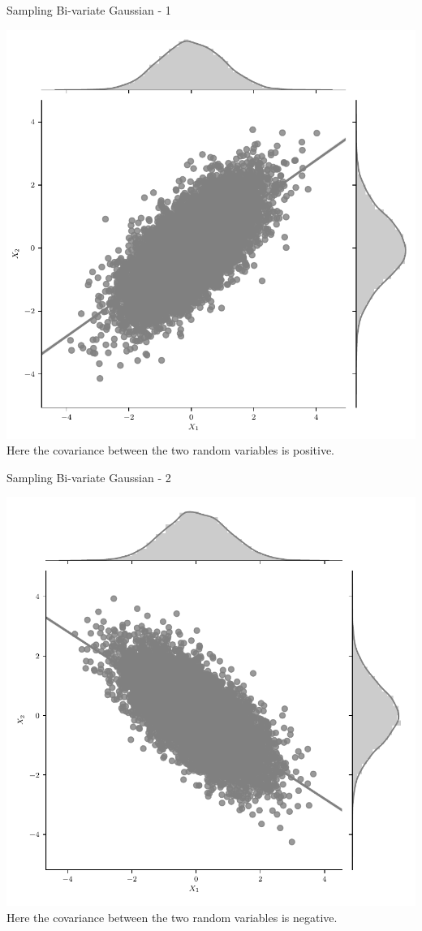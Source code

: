 \documentclass{beamer}
\begin{document}
\begin{frame}{Sampling Bi-variate Gaussian - 1}
\begin{center}
	\includegraphics[height=\textheight -45pt ,keepaspectratio]{gp/2d-gp}\\
	Here the covariance between the two random variables is positive.
\end{center}
\end{frame}


\begin{frame}{Sampling Bi-variate Gaussian - 2}
	\begin{center}
		\includegraphics[height=\textheight -45pt ,keepaspectratio]{gp/2d-gp2}\\
		Here the covariance between the two random variables is negative.
	\end{center}
\end{frame}
\end{document}

